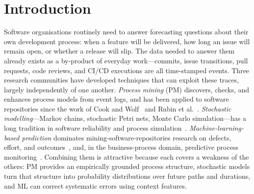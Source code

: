 \section{Introduction}
\label{sec:slr-intro}

Software organisations routinely need to answer forecasting questions about
their own development process: when a feature will be delivered, how long an
issue will remain open, or whether a release will slip. The data needed to
answer them already exists as a by-product of everyday work---commits, issue
transitions, pull requests, code reviews, and CI/CD executions are all
time-stamped events. Three research communities have developed techniques
that can exploit these traces, largely independently of one another.
\emph{Process mining} (PM) discovers, checks, and enhances process models
from event logs, and has been applied to software repositories since the
work of Cook and Wolf~\cite{cook1995,cook1998} and Rubin et
al.~\cite{rubin2007}. \emph{Stochastic modelling}---Markov chains,
stochastic Petri nets, Monte Carlo simulation---has a long tradition in
software reliability and process simulation~\cite{whittaker1994,ali2014simulation}.
\emph{Machine-learning-based prediction} dominates mining-software-repositories
research on defects, effort, and outcomes~\cite{kagdi2007msr,hall2012fault},
and, in the business-process domain, predictive process
monitoring~\cite{marquezchamorro2018predictive}. Combining them is attractive
because each covers a weakness of the others: PM provides an empirically
grounded process structure, stochastic models turn that structure into
probability distributions over future paths and durations, and ML can
correct systematic errors using context features.

